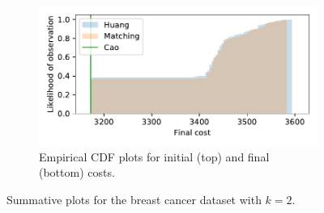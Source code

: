\documentclass[11pt]{article}
\begin{document}
\begin{figure}
\begin{subfigure}{.5\textwidth}
        \includegraphics[width=\linewidth]{Fig5b2.pdf}
        \caption{Empirical CDF plots for initial (top) and final (bottom)
                 costs.}
    \end{subfigure}
    \caption{Summative plots for the breast cancer dataset with \(k=2\).}%
    \label{fig:breast_cancer_nclasses}
\end{figure}
\end{document}
